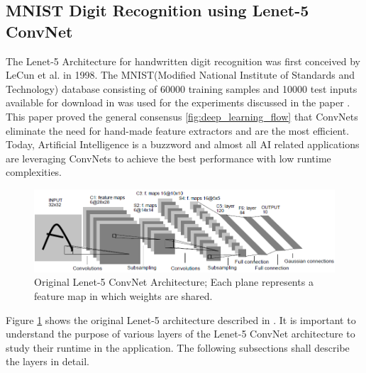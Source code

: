 \subsection{MNIST Digit Recognition using Lenet-5 ConvNet}
\label{4_1_1}
The Lenet-5 Architecture for handwritten digit recognition was first conceived by LeCun et al. in 1998. The MNIST(Modified National Institute of Standards and Technology) database consisting of 60000 training samples and 10000 test inputs available for download in \cite{mnist_database} was used for the experiments discussed in the paper \cite{lecun1998gradient}. This paper proved the general consensus \ref{fig:deep_learning_flow}  that ConvNets eliminate the need for hand-made feature extractors and are the most efficient. Today, Artificial Intelligence is a buzzword and almost all AI related applications are leveraging ConvNets to achieve the best performance with low runtime complexities. 
\begin{figure}[h!]
  \centering
  \includegraphics[width=\linewidth]{figures/Lenet-5-org.PNG}
  \caption{Original Lenet-5 ConvNet Architecture; Each plane represents a feature map in which weights are shared.
  \cite{lecun1998gradient}}
  \label{fig:Lenet-5-org}
\end{figure}
Figure \ref{fig:Lenet-5-org} shows the original Lenet-5 architecture described in \cite{lecun1998gradient}. 
It is important to understand the purpose of various layers of the Lenet-5 ConvNet architecture to study their runtime in the application. The following subsections shall describe the layers in detail.
